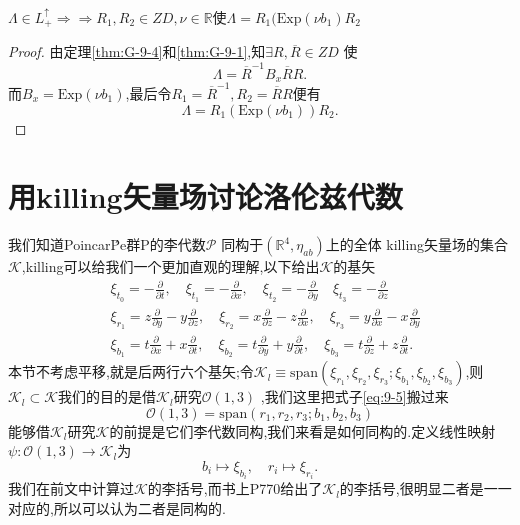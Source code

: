 \documentclass[../main.tex]{subfiles}
\begin{document}
\begin{theorem}
  $\Lambda \in L^\uparrow_+\Rightarrow \Rightarrow R_1,R_2 \in ZD , \nu \in  \mathbb{R}$使$\Lambda = R_1(\text{Exp}(\nu b_1) R_2$ 
\end{theorem}
\begin{proof}
  由定理\ref{thm:G-9-4}和\ref{thm:G-9-1},知$\exists R,\overline{R} \in ZD$ 使 \[
 \Lambda = \overline{R}^{-1} B_x \overline{R} R 
  .\] 
  而$B_x = \text{Exp}(\nu b_1)$,最后令$R_1 = \overline{R}^{-1},R_2 = \overline{R}R$便有\[
 \Lambda = R_1(\text{Exp}(\nu b_1))R_2 
  .\] 
\end{proof}
\section{用killing矢量场讨论洛伦兹代数}
我们知道Poincar\'P{e}群P的李代数$\mathscr{P}$ 同构于$(\mathbb{R}^{4},\eta_{ab})$上的全体
killing矢量场的集合$\mathscr{K}$,killing可以给我们一个更加直观的理解,以下给出$\mathscr{K}$的基矢
\begin{align}
  &\xi_{t_0} = - \frac{\partial }{\partial t}, \quad \xi_{t_1} = - \frac{\partial   }{\partial x}, \quad \xi_{t_2} = - \frac{\partial   }{\partial y} \quad \xi_{t_3} = - \frac{\partial   }{\partial z}\\
  &\xi_{r_1} = z \frac{\partial }{\partial y}- y \frac{\partial }{\partial z} , \quad  \xi_{r_2} = x \frac{\partial  }{\partial z} - z \frac{\partial   }{\partial x} , \quad \xi_{r_3} = y \frac{\partial  }{\partial x} - x \frac{\partial   }{\partial y}\label{eq:9-4}\\  
  &\xi_{b_1} = t \frac{\partial }{\partial x}+ x \frac{\partial }{\partial t} , \quad  \xi_{b_2} = t \frac{\partial  }{\partial y} + y \frac{\partial   }{\partial t} , \quad \xi_{b_3} = t \frac{\partial  }{\partial z} + z \frac{\partial   }{\partial t} 
.\end{align}
本节不考虑平移,就是后两行六个基矢;令$\mathscr{K}_l \equiv \text{span}(\xi_{r_1},\xi_{r_2},\xi_{r_3};\xi_{b_1},\xi_{b_2},\xi_{b_3})$,则$\mathscr{K}_l \subset \mathscr{K}$我们的目的是借$\mathscr{K}_l$研究$\mathscr{O}(1,3)$
,我们这里把式子\ref{eq:9-5}搬过来
\begin{equation*}
  \mathscr{O}(1,3) =\text{span}(r_1,r_2,r_3;b_1,b_2,b_3) 
\end{equation*}
能够借$\mathscr{K}_l$研究$\mathscr{K}$的前提是它们李代数同构,我们来看是如何同构的.定义线性映射$\psi:\mathscr{O}(1,3) \to \mathscr{K}_l$为\[
  b_i \mapsto \xi_{b_i},\quad r_i \mapsto \xi_{r_i} 
.\] 
我们在前文中计算过$\mathscr{K}$的李括号,而书上P770给出了$\mathscr{K}_l$的李括号,很明显二者是一一对应的,所以可以认为二者是同构的.
\end{document}
